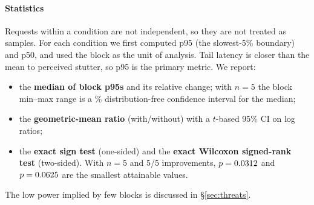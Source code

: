 \documentclass[11pt]{article}
\begin{document}
\paragraph{Statistics}
Requests within a condition are not independent, so they are not treated as samples. For each condition we first computed p95 (the slowest-5\% boundary) and p50, and used the block as the unit of analysis. Tail latency is closer than the mean to perceived stutter, so p95 is the primary metric. We report:
\begin{itemize}
  \item the \textbf{median of block p95s} and its relative change; with $n=5$ the block min--max range is a \numCiLevel\% distribution-free confidence interval for the median;
  \item the \textbf{geometric-mean ratio} (with/without) with a $t$-based 95\% CI on log ratios;
  \item the \textbf{exact sign test} (one-sided) and the \textbf{exact Wilcoxon signed-rank test} (two-sided). With $n=5$ and 5/5 improvements, $p=0.0312$ and $p=0.0625$ are the smallest attainable values.
\end{itemize}
The low power implied by few blocks is discussed in \S\ref{sec:threats}.
\end{document}
